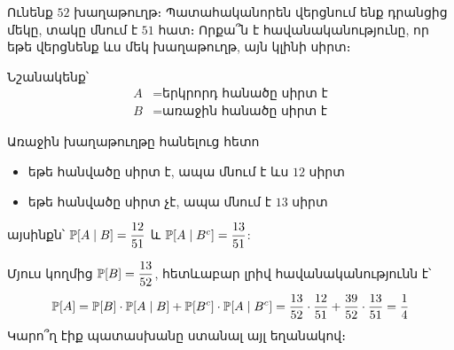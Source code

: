 \begin{example}
Ունենք $52$ խաղաթուղթ։ Պատահականորեն վերցնում ենք դրանցից մեկը, տակը մնում է $51$ հատ։ Որքա՞ն է հավանականու\-թյունը, որ եթե վերցնենք ևս մեկ խաղաթուղթ, այն կլինի սիրտ։

Նշանակենք՝
\begin{align*}
    A &= \text{երկրորդ հանածը սիրտ է} \\
    B &= \text{առաջին հանածը սիրտ է}
\end{align*}

\begin{marginfigure}
\end{marginfigure}
Առաջին խաղաթուղթը հանելուց հետո
\begin{itemize}
    \item եթե հանվածը սիրտ է, ապա մնում է ևս $12$ սիրտ
    \item եթե հանվածը սիրտ չէ, ապա մնում է $13$ սիրտ
\end{itemize}
այսինքն՝ $\mathbb{P}[A \mid B] = \dfrac{12}{51}$ և $\mathbb{P}[A \mid B^c] = \dfrac{13}{51}$:

Մյուս կողմից $\mathbb{P}[B] = \dfrac{13}{52}$, հետևաբար լրիվ հավանականությունն է՝
\[ 
\mathbb{P}[A] =
\mathbb{P}[B]\cdot \mathbb{P}[A\mid B] + \mathbb{P}[B^c] \cdot \mathbb{P}[A \mid B^c] =
\frac{13}{52}\cdot \frac{12}{51} + \frac{39}{52}\cdot \frac{13}{51} = \frac{1}{4}
\]
Կարո՞ղ էիք պատասխանը ստանալ այլ եղանակով։
\end{example}


